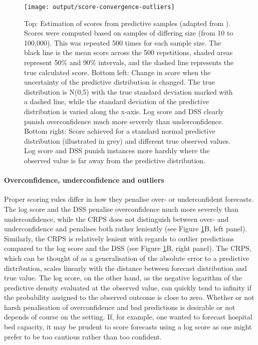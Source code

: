 \documentclass[
]{jss}
\begin{document}
\begin{CodeChunk}
\begin{figure}

{\centering \texttt{[image: output/score-convergence-outliers]}

}

\caption[Top]{Top: Estimation of scores from predictive samples (adapted from \citep{jordanEvaluatingProbabilisticForecasts2019}). Scores were computed based on samples of differing size (from 10 to 100,000). This was repeated 500 times for each sample size. The black line is the mean score across the 500 repetitions, shaded areas represent 50\% and 90\% intervals, and the dashed line represents the true calculated score.  Bottom left: Change in score when the uncertainty of the predictive distribution is changed. The true distribution is N(0,5) with the true standard deviation marked with a dashed line, while the standard deviation of the predictive distribution is varied along the x-axis. Log score and DSS clearly punish overconfidence much more severely than underconfidence. Bottom right: Score achieved for a standard normal predictive distribution (illustrated in grey) and different true observed values. Log score and DSS punish instances more harshly where the observed value is far away from the predictive distribution.}\label{fig:score-convergence}
\end{figure}
\end{CodeChunk}

\hypertarget{overconfidence-underconfidence-and-outliers}{%
\paragraph{Overconfidence, underconfidence and
outliers}\label{overconfidence-underconfidence-and-outliers}}

Proper scoring rules differ in how they penalise over- or underconfident
forecasts. The log score and the DSS penalise overconfidence much more
severely than underconfidence, while the CRPS does not distinguish
between over- and underconfidence and penalises both rather leniently
\citep{macheteContrastingProbabilisticScoring2012} (see Figure
\ref{fig:score-convergence}B, left panel). Similarly, the CRPS is
relatively lenient with regards to outlier predictions compared to the
log score and the DSS (see Figure \ref{fig:score-convergence}B, right
panel). The CRPS, which can be thought of as a generalisation of the
absolute error to a predictive distribution, scales linearly with the
distance between forecast distribution and true value. The log score, on
the other hand, as the negative logarithm of the predictive density
evaluated at the observed value, can quickly tend to infinity if the
probability assigned to the observed outcome is close to zero. Whether
or not harsh penalisation of overconfidence and bad predictions is
desirable or not depends of course on the setting. If, for example, one
wanted to forecast hospital bed capacity, it may be prudent to score
forecasts using a log score as one might prefer to be too cautious
rather than too confident.
\end{document}
